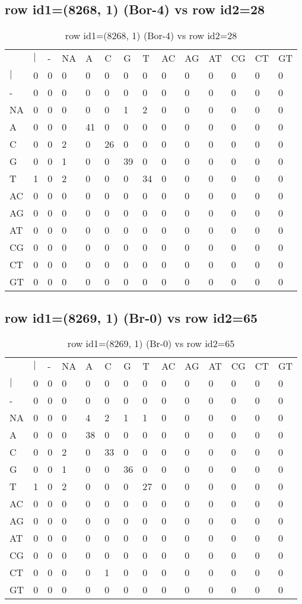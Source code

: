 \subsection{row id1=(8268, 1) (Bor-4) vs row id2=28}
\begin{center}
\begin{longtable}{|l|l|l|l|l|l|l|l|l|l|l|l|l|l|}
\caption{row id1=(8268, 1) (Bor-4) vs row id2=28} \label{table_dm414}\\
\hline
\\
\hline
&$|$&-&NA&A&C&G&T&AC&AG&AT&CG&CT&GT\\
$|$&0&0&0&0&0&0&0&0&0&0&0&0&0\\
-&0&0&0&0&0&0&0&0&0&0&0&0&0\\
NA&0&0&0&0&0&1&2&0&0&0&0&0&0\\
A&0&0&0&41&0&0&0&0&0&0&0&0&0\\
C&0&0&2&0&26&0&0&0&0&0&0&0&0\\
G&0&0&1&0&0&39&0&0&0&0&0&0&0\\
T&1&0&2&0&0&0&34&0&0&0&0&0&0\\
AC&0&0&0&0&0&0&0&0&0&0&0&0&0\\
AG&0&0&0&0&0&0&0&0&0&0&0&0&0\\
AT&0&0&0&0&0&0&0&0&0&0&0&0&0\\
CG&0&0&0&0&0&0&0&0&0&0&0&0&0\\
CT&0&0&0&0&0&0&0&0&0&0&0&0&0\\
GT&0&0&0&0&0&0&0&0&0&0&0&0&0\\
\hline
\end{longtable}
\end{center}

\subsection{row id1=(8269, 1) (Br-0) vs row id2=65}
\begin{center}
\begin{longtable}{|l|l|l|l|l|l|l|l|l|l|l|l|l|l|}
\caption{row id1=(8269, 1) (Br-0) vs row id2=65} \label{table_dm416}\\
\hline
\\
\hline
&$|$&-&NA&A&C&G&T&AC&AG&AT&CG&CT&GT\\
$|$&0&0&0&0&0&0&0&0&0&0&0&0&0\\
-&0&0&0&0&0&0&0&0&0&0&0&0&0\\
NA&0&0&0&4&2&1&1&0&0&0&0&0&0\\
A&0&0&0&38&0&0&0&0&0&0&0&0&0\\
C&0&0&2&0&33&0&0&0&0&0&0&0&0\\
G&0&0&1&0&0&36&0&0&0&0&0&0&0\\
T&1&0&2&0&0&0&27&0&0&0&0&0&0\\
AC&0&0&0&0&0&0&0&0&0&0&0&0&0\\
AG&0&0&0&0&0&0&0&0&0&0&0&0&0\\
AT&0&0&0&0&0&0&0&0&0&0&0&0&0\\
CG&0&0&0&0&0&0&0&0&0&0&0&0&0\\
CT&0&0&0&0&1&0&0&0&0&0&0&0&0\\
GT&0&0&0&0&0&0&0&0&0&0&0&0&0\\
\hline
\end{longtable}
\end{center}


